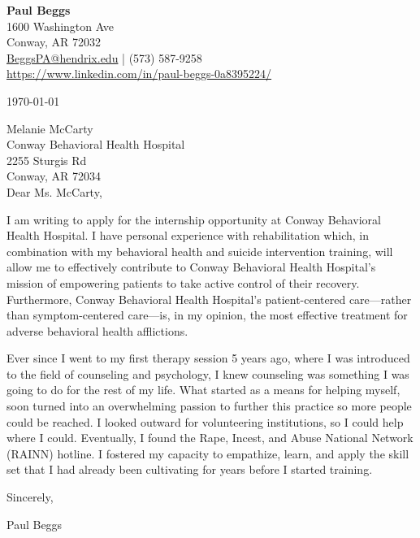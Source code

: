 \documentclass[11pt,letterpaper]{article}
\begin{document}
\begin{center}
    \LARGE \textbf{Paul Beggs} \\
    \vspace{0.2cm}
    \normalsize
    1600 Washington Ave \\
    Conway, AR 72032 \\
    \href{mailto:BeggsPA@hendrix.edu}{BeggsPA@hendrix.edu} | (573) 587-9258 \\
    \url{https://www.linkedin.com/in/paul-beggs-0a8395224/}
\end{center}

\vspace{0.25cm}
\singlespacing




\today

Melanie McCarty \\
Conway Behavioral Health Hospital \\
2255 Sturgis Rd \\
Conway, AR 72034 \\

Dear Ms. McCarty,


I am writing to apply for the internship opportunity at Conway Behavioral Health Hospital. I have personal experience with rehabilitation which, in combination with my behavioral health and suicide intervention training, will allow me to effectively contribute to Conway Behavioral Health Hospital's mission of empowering patients to take active control of their recovery. Furthermore, Conway Behavioral Health Hospital's patient-centered care---rather than symptom-centered care---is, in my opinion, the most effective treatment for adverse behavioral health afflictions.

Ever since I went to my first therapy session 5 years ago, where I was introduced to the field of counseling and psychology, I knew counseling was something I was going to do for the rest of my life. What started as a means for helping myself, soon turned into an overwhelming passion to further this practice so more people could be reached. I looked outward for volunteering institutions, so I could help where I could. Eventually, I found the Rape, Incest, and Abuse National Network (RAINN) hotline. I fostered my capacity to empathize, learn, and apply the skill set that I had already been cultivating for years before I started training.     





Sincerely, \\

\vspace*{1cm}

Paul Beggs
\end{document}
